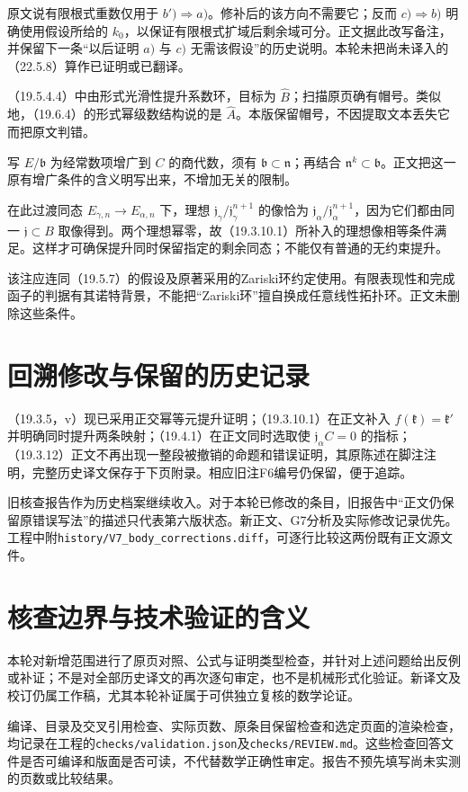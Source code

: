原文说有限根式重数仅用于 $b')\Rightarrow a)$。修补后的该方向不需要它；反而 $c)\Rightarrow b)$ 明确使用假设所给的 $k_0$，以保证有限根式扩域后剩余域可分。正文据此改写备注，并保留下一条“以后证明 $a)$ 与 $c)$ 无需该假设”的历史说明。本轮未把尚未译入的（22.5.8）算作已证明或已翻译。

（19.5.4.4）中由形式光滑性提升系数环，目标为 $\widehat B$；扫描原页确有帽号。类似地，（19.6.4）的形式幂级数结构说的是 $\widehat A$。本版保留帽号，不因提取文本丢失它而把原文判错。

写 $E/\mathfrak b$ 为经常数项增广到 $C$ 的商代数，须有 $\mathfrak b\subset\mathfrak n$；再结合 $\mathfrak n^k\subset\mathfrak b$。正文把这一原有增广条件的含义明写出来，不增加无关的限制。

在此过渡同态 $E_{\gamma,n}\to E_{\alpha,n}$ 下，理想
$\mathfrak j_\gamma/\mathfrak j_\gamma^{n+1}$ 的像恰为
$\mathfrak j_\alpha/\mathfrak j_\alpha^{n+1}$，因为它们都由同一 $\mathfrak j\subset B$ 取像得到。两个理想幂零，故（19.3.10.1）所补入的理想像相等条件满足。这样才可确保提升同时保留指定的剩余同态；不能仅有普通的无约束提升。

该注应连同（19.5.7）的假设及原著采用的Zariski环约定使用。有限表现性和完成函子的判据有其诺特背景，不能把“Zariski环”擅自换成任意线性拓扑环。正文未删除这些条件。

\section*{回溯修改与保留的历史记录}
（19.3.5，v）现已采用正交幂等元提升证明；（19.3.10.1）在正文补入 $f(\mathfrak k)=\mathfrak k'$ 并明确同时提升两条映射；（19.4.1）在正文同时选取使 $\mathfrak j_\alpha C=0$ 的指标；（19.3.12）正文不再出现一整段被撤销的命题和错误证明，其原陈述在脚注注明，完整历史译文保存于下页附录。相应旧注F6编号仍保留，便于追踪。

旧核查报告作为历史档案继续收入。对于本轮已修改的条目，旧报告中“正文仍保留原错误写法”的描述只代表第六版状态。新正文、G7分析及实际修改记录优先。工程中附\texttt{history/V7\_body\_corrections.diff}，可逐行比较这两份既有正文源文件。

\section*{核查边界与技术验证的含义}
本轮对新增范围进行了原页对照、公式与证明类型检查，并针对上述问题给出反例或补证；不是对全部历史译文的再次逐句审定，也不是机械形式化验证。新译文及校订仍属工作稿，尤其本轮补证属于可供独立复核的数学论证。

编译、目录及交叉引用检查、实际页数、原条目保留检查和选定页面的渲染检查，均记录在工程的\texttt{checks/validation.json}及\texttt{checks/REVIEW.md}。这些检查回答文件是否可编译和版面是否可读，不代替数学正确性审定。报告不预先填写尚未实测的页数或比较结果。


